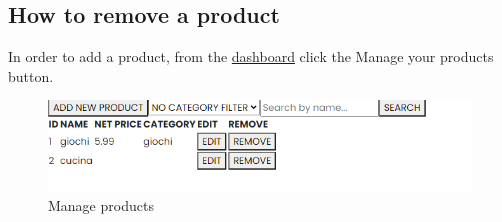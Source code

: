 \subsection{How to remove a product}
In order to add a product, from the \hyperref[_dashboard]{dashboard} click the Manage your products button.
\begin{figure}[H]
    \centering
    \includegraphics[width=\linewidth]{res/images/venditore/productmanagement.png}
    \caption{Manage products}
\end{figure}

